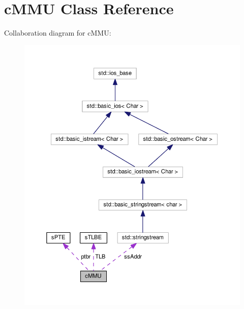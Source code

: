 \hypertarget{classcMMU}{\section{c\-M\-M\-U \-Class \-Reference}
\label{df/deb/classcMMU}
}


\-Collaboration diagram for c\-M\-M\-U\-:\nopagebreak
\begin{figure}[H]
\begin{center}
\leavevmode
\includegraphics[width=350pt]{dc/d5d/classcMMU__coll__graph}
\end{center}
\end{figure}
